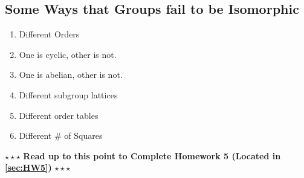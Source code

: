\subsection*{Some Ways that Groups fail to be Isomorphic}
\begin{enumerate}
    \item Different Orders
    \item One is cyclic, other is not.
    \item One is abelian, other is not.
    \item Different subgroup lattices
    \item Different order tables
    \item Different \# of Squares
\end{enumerate}
\begin{tcolorbox}
    \begin{center}
        $\star\star\star$ \textbf{Read up to this point to Complete Homework 5 (Located in \ref{sec:HW5})} $\star\star\star$
    \end{center}
    \end{tcolorbox}
\newpage
\setcounter{dummy}{0}
